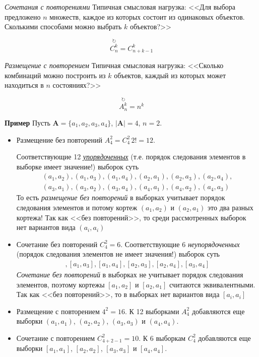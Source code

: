 \documentclass[%
	11pt,
	a4paper,
	utf8,
		]{article}
\begin{document}
\emph{Сочетания с повторениями} Типичная смысловая нагрузка: <<Для выбора предложено $ n $ множеств, каждое из которых состоит из одинаковых объектов. Сколькими способами можно выбрать $ k $ объектов?>>

$$ \stackrel{\circlearrowright}{C_n^k} = C_{n + k - 1}^k $$

\emph{Размещение с повторением} Типичная смысловая нагрузка: <<Сколько комбинаций можно построить из $ k $ объектов, каждый из которых может находиться в $ n $ состояниях?>>

$$ \stackrel{\circlearrowright}{A_n^k} = n^k $$

\textbf{Пример} \cite[]{shiryaev:prob-2013} Пусть $ \mathbf{A} = \{a_1, a_2, a_3, a_4\} $, $ | \mathbf{A} | = 4 $, $ n = 2 $.

\begin{itemize}
	\item Размещение без повторений $ A_4^2 = C_4^2 \, 2! = 12 $. 
	
	Соответствующие 12 \emph{\underline{упорядоченных}} (т.е. порядок следования элементов в выборке имеет значение!) выборок суть
	\begin{align*}
		(a_1, a_2), (a_1, a_3), (a_1, a_4), (a_2, a_1), (a_2, a_3), (a_2, a_4),\\ (a_3, a_1), (a_3, a_2), (a_3, a_4), (a_4, a_1), (a_4, a_2), (a_4, a_3)
	\end{align*}
    То есть \emph{размещение без повторений} в выборках учитывает порядок следования элементов и потому кортеж $ (a_1, a_2) $ и $ (a_2, a_1) $ это два разных кортежа! Так как <<без повторений>>, то среди рассмотренных выборок нет вариантов вида $ (a_i, a_i) $
    
    \item Сочетание без повторений $ C_4^2 = 6 $. Соответствующие 6 \emph{неупорядоченных} (порядок следования элементов не имеет значения!) выборок суть
    \begin{align*}
    	[a_1, a_2], [a_1, a_3], [a_1, a_4], [a_2, a_3], [a_2, a_4], [a_3, a_4]
    \end{align*} 
    \emph{Сочетание без повторений} в выборках не учитывает порядок следования элементов, поэтому кортежы $ [a_1, a_2] $ и $ [a_2, a_1] $ считаются эквивалентными. Так как <<без повторений>>, то в выборках нет вариантов вида $ [a_i, a_i] $
    
    \item Размещение с повторением $ 4^2 = 16 $. К 12 выборками $ A_4^2 $ добавляются еще выборки $ (a_1, a_1) $, $ (a_2, a_2) $, $ (a_3, a_3) $ и $ (a_4, a_4) $.
    
    \item Сочетание с повторением $ C_{4 + 2 -1}^2 = 10 $. К 6 выборкам $ C_4^2 $ добавляются еще выборки $ [a_1, a_1] $, $ [a_2, a_2]$, $ [a_3, a_3] $ и $ [a_4, a_4] $.
\end{itemize}
\end{document}
